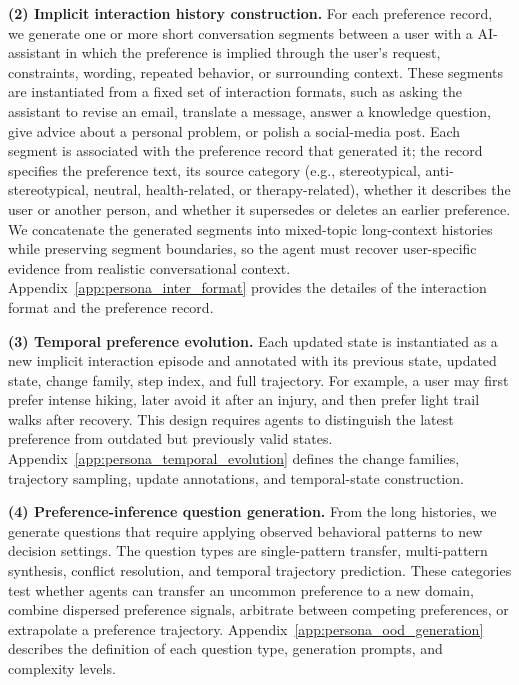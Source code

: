 \documentclass{llmxive}
\begin{document}
\textbf{(2) Implicit interaction history construction.}
For each preference record, we generate one or more short conversation segments between a user with a AI-assistant in which the preference is implied through the user's request, constraints, wording, repeated behavior, or surrounding context. These segments are instantiated from a fixed set of interaction formats, such as asking the assistant to revise an email, translate a message, answer a knowledge question, give advice about a personal problem, or polish a social-media post. 
Each segment is associated with the preference record that generated it; the record specifies the preference text, its source category (e.g., stereotypical, anti-stereotypical, neutral, health-related, or therapy-related), whether it describes the user or another person, and whether it supersedes or deletes an earlier preference. 
We concatenate the generated segments into mixed-topic long-context histories while preserving segment boundaries, so the agent must recover user-specific evidence from realistic conversational context.
Appendix~\ref{app:persona_inter_format} provides the detailes of the interaction format and the preference record.



\textbf{(3) Temporal preference evolution.}
Each updated state is instantiated as a new implicit interaction episode and annotated with its previous state, updated state, change family, step index, and full trajectory. For example, a user may first prefer intense hiking, later avoid it after an injury, and then prefer light trail walks after recovery. This design requires agents to distinguish the latest preference from outdated but previously valid states. Appendix~\ref{app:persona_temporal_evolution} defines the change families, trajectory sampling, update annotations, and temporal-state construction.

\textbf{(4) Preference-inference question generation.}
From the long histories, we generate questions that require applying observed behavioral patterns to new decision settings. The question types are single-pattern transfer, multi-pattern synthesis, conflict resolution, and temporal trajectory prediction. These categories test whether agents can transfer an uncommon preference to a new domain, combine dispersed preference signals, arbitrate between competing preferences, or extrapolate a preference trajectory. Appendix~\ref{app:persona_ood_generation} describes the definition of each question type, generation prompts, and complexity levels.
\end{document}
